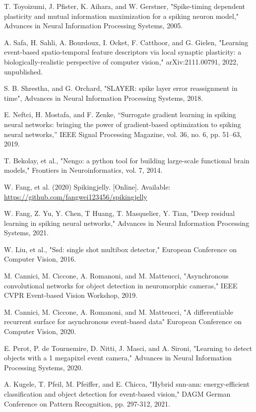 \documentclass[conference]{IEEEtran}
\begin{document}
\begin{thebibliography}{00}
 T. Toyoizumi, J. Pfister, K. Aihara, and W. Gerstner, "Spike-timing dependent plasticity and mutual information maximization for a spiking neuron model," Advances in Neural Information Processing Systems, 2005.

 A. Safa, H. Sahli, A. Bourdoux, I. Ocket, F. Catthoor, and G. Gielen, "Learning event-based spatio-temporal feature descriptors via local synaptic plasticity: a biologically-realistic perspective of computer vision," arXiv:2111.00791, 2022, unpublished.

 S. B. Shrestha, and G. Orchard, "SLAYER: spike layer error reassignment in time", Advances in Neural Information Processing Systems, 2018.

 E. Neftci, H. Mostafa, and F. Zenke, “Surrogate gradient learning in spiking neural networks: bringing the power of gradient-based optimization to spiking neural networks,” IEEE Signal Processing Magazine, vol. 36, no. 6, pp. 51–63, 2019.

 T. Bekolay, et al., "Nengo: a python tool for building large-scale functional brain models," Frontiers in Neuroinformatics, vol. 7, 2014.

 W. Fang, et al. (2020) Spikingjelly. [Online]. Available: \url{https://github.com/fangwei123456/spikingjelly}

 W. Fang, Z. Yu, Y. Chen, T Huang, T. Masquelier, Y. Tian, "Deep residual learning in spiking neural networks," Advances in Neural Information Processing Systems, 2021.

 W. Liu, et al., "Ssd: single shot multibox detector," European Conference on Computer Vision, 2016.

 M. Cannici, M. Ciccone, A. Romanoni, and M. Matteucci, "Asynchronous convolutional networks for object detection in neuromorphic cameras," IEEE CVPR Event-based Vision Workshop, 2019.

 M. Cannici, M. Ciccone, A. Romanoni, and M. Matteucci, "A differentiable recurrent surface for asynchronous event-based data" European Conference on Computer Vision, 2020.

 E. Perot, P. de Tournemire, D. Nitti, J. Masci, and A. Sironi, "Learning to detect objects with a 1 megapixel event camera," Advances in Neural Information Processing Systems, 2020.

 A. Kugele, T. Pfeil, M. Pfeiffer, and E. Chicca, "Hybrid snn-ann: energy-efficient classification and object detection for event-based vision," DAGM German Conference on Pattern Recognition, pp. 297-312, 2021.


\end{thebibliography}
\end{document}
